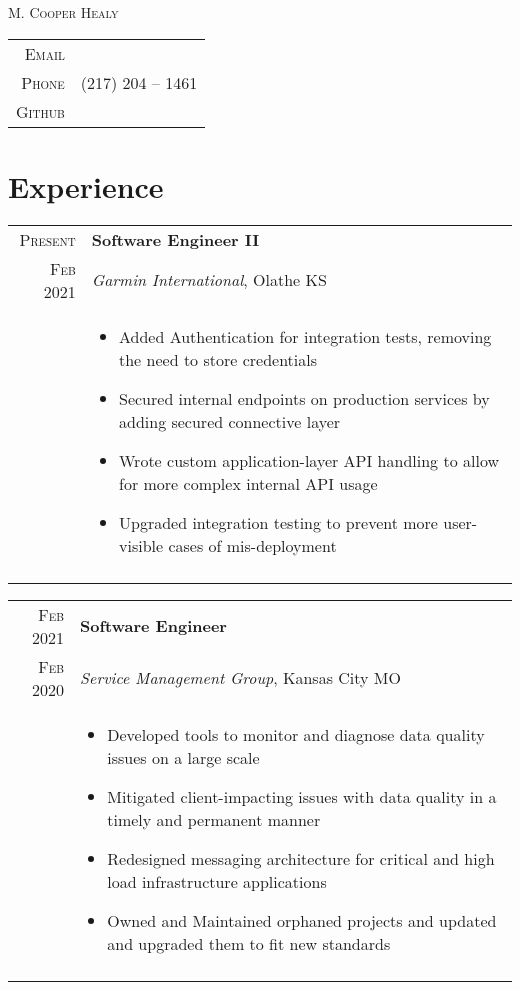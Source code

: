\documentclass[a4paper,10pt]{article}
\newcommand{\lmline}[1]{%
  \uline{\phantom{#1}}%
  \llap{\contour{white}{#1}}%
}
\newcommand{\br}{\\\multicolumn{2}{c}{}}
\begin{document}
\pagestyle{empty}

\par{\centering
    {\Huge \textsc{M. Cooper Healy}
}\bigskip\par}

\begin{center}
\begin{tabular}{rl}
    \textsc{Email }        & \lmline{cooper@healy.ink} \\
    \textsc{Phone }        & (217) 204 -- 1461  \\
    \textsc{Github }       & \lmline{https://github.com/healym} \\
\end{tabular}
\end{center}


\section{Experience}

\begin{tabular}{r|p{15cm}}
    \textsc{Present}  & \textbf{Software Engineer II} \\
    \textsc{Feb 2021} & \textit{Garmin International}, Olathe KS \\ &
    \begin{itemize}
    \item Added Authentication for integration tests, removing the need to store credentials
    \item Secured internal endpoints on production services by adding secured connective layer
    \item Wrote custom application-layer API handling to allow for more complex internal API usage
    \item Upgraded integration testing to prevent more user-visible cases of mis-deployment

    \end{itemize} \br\\

\end{tabular}

\begin{tabular}{r|p{15cm}}
    \textsc{Feb 2021}  & \textbf{Software Engineer} \\
    \textsc{Feb 2020}  & \textit{Service Management Group}, Kansas City MO \\ &
    \begin{itemize}
    \item Developed tools to monitor and diagnose data quality issues on a large scale
    \item Mitigated client-impacting issues with data quality in a timely and permanent manner
    \item Redesigned messaging architecture for critical and high load infrastructure applications
    \item Owned and Maintained orphaned projects and updated and upgraded them to fit new standards

    \end{itemize} \br\\

\end{tabular}
\end{document}

